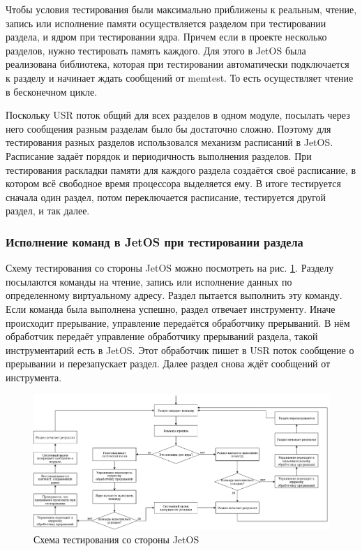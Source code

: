 \documentclass[oneside,senior,etd]{BYUPhys}
\begin{document}
Чтобы условия тестирования были максимально приближены к реальным, чтение, запись или исполнение
памяти осуществляется разделом при тестировании раздела, и ядром при тестировании ядра.
Причем если в проекте несколько разделов, нужно тестировать память каждого. Для этого
в JetOS была реализована библиотека, которая при тестировании автоматически
подключается к разделу и начинает ждать сообщений от memtest. То есть осуществляет
чтение в бесконечном цикле.

Поскольку USR поток общий для всех разделов в одном модуле, посылать через него сообщения
разным разделам было бы достаточно сложно. Поэтому для тестирования разных разделов
использовался механизм расписаний в JetOS. Расписание задаёт порядок и периодичность
выполнения разделов. При тестирования раскладки памяти для каждого раздела создаётся своё
расписание, в котором всё свободное время процессора выделяется ему. В итоге тестируется сначала
один раздел, потом переключается расписание, тестируется другой раздел, и так далее.

\subsubsection{Исполнение команд в JetOS при тестировании раздела}

Схему тестирования со стороны JetOS можно посмотреть на рис. \ref{testing_scheme}.
Разделу посылаются команды на чтение, запись или исполнение данных по определенному виртуальному адресу.
Раздел пытается выполнить эту команду. Если команда была выполнена успешно, раздел
отвечает инструменту. Иначе происходит прерывание, управление передаётся обработчику
прерываний. В нём обработчик передаёт управление обработчику прерываний раздела,
такой инструментарий есть в JetOS. Этот обработчик пишет в USR поток сообщение о прерывании
и перезапускает раздел. Далее раздел снова ждёт сообщений от инструмента.

\begin{figure}[t]
  \centering
  \includegraphics[width=\textwidth]{./testing_scheme.png}
  \caption{Схема тестирования со стороны JetOS}
  \label{testing_scheme}
\end{figure}
\end{document}
